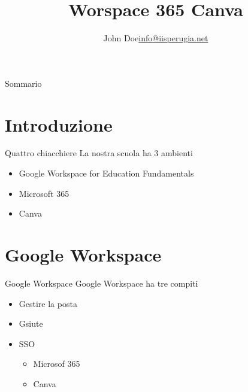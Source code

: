\documentclass{beamer}
\title{Worspace 365 Canva}
\author{\texorpdfstring{John Doe\newline\url{info@iisperugia.net}}{John Doe}}
\begin{document}
\begin{frame}%
    \maketitle
 
 
\end{frame}
\begin{frame}{Sommario}
	\tableofcontents
\end{frame}
\section{Introduzione}
\begin{frame}{Quattro chiacchiere}
	La nostra scuola ha 3 ambienti 
	\begin{itemize}[(I)]
		\item<1-> Google Workspace for Education Fundamentals
		\item<2-> Microsoft 365
		\item<3-> Canva
	\end{itemize}
\end{frame}
\section{Google Workspace}
\begin{frame}{Google Workspace}
 Google Workspace ha tre compiti
	\begin{itemize}[(I)]
		\item<1-> Gestire la posta
		\item<2-> Gsiute 
		\item<3-> SSO
		\begin{itemize}
			\item<4->Microsof 365
			\item<5->Canva
		\end{itemize}
	\end{itemize}
\end{frame}
\end{document}

